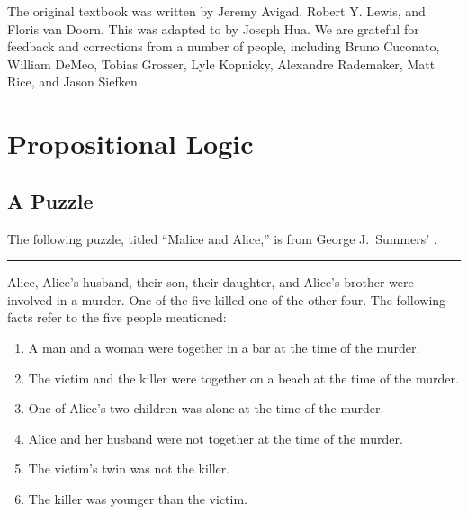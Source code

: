 \documentclass[letterpaper,10pt,english]{sphinxmanual}
\begin{document}
\sphinxAtStartPar
The original textbook was written by Jeremy Avigad, Robert Y. Lewis, and Floris van Doorn.
This was adapted to  by Joseph Hua.
We are grateful for feedback and corrections from a number of people,
including Bruno Cuconato, William DeMeo, Tobias Grosser, Lyle Kopnicky,
Alexandre Rademaker, Matt Rice, and Jason Siefken.


\chapter{Propositional Logic}
\label{\detokenize{propositional_logic:propositional-logic}}\label{\detokenize{propositional_logic:id1}}\label{\detokenize{propositional_logic::doc}}

\section{A Puzzle}
\label{\detokenize{propositional_logic:a-puzzle}}
\sphinxAtStartPar
The following puzzle, titled “Malice and Alice,” is from George J. Summers’ .


\bigskip\hrule\bigskip


\sphinxAtStartPar
Alice, Alice’s husband, their son, their daughter, and Alice’s brother were involved in a murder. One of the five killed one of the other four. The following facts refer to the five people mentioned:
\begin{enumerate}
%
\item {} 
\sphinxAtStartPar
A man and a woman were together in a bar at the time of the murder.

\item {} 
\sphinxAtStartPar
The victim and the killer were together on a beach at the time of the murder.

\item {} 
\sphinxAtStartPar
One of Alice’s two children was alone at the time of the murder.

\item {} 
\sphinxAtStartPar
Alice and her husband were not together at the time of the murder.

\item {} 
\sphinxAtStartPar
The victim’s twin was not the killer.

\item {} 
\sphinxAtStartPar
The killer was younger than the victim.

\end{enumerate}
\end{document}
